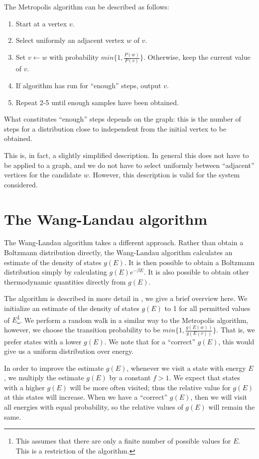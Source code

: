 \documentclass{article}
\begin{document}
The Metropolis algorithm can be described as follows:
\begin{enumerate}
    \item Start at a vertex $v$.
    \item Select uniformly an adjacent vertex $w$ of $v$.
    \item Set $v \leftarrow w$ with probability $min\{1, \frac{P(w)}{P(v)}\}$. Otherwise, keep the current value of $v$.
    \item If algorithm has run for ``enough'' steps, output $v$.
    \item Repeat 2-5 until enough samples have been obtained.
\end{enumerate}

What constitutes ``enough'' steps depends on the graph: this is the number of steps for a distribution close to independent from the initial vertex to be obtained.

This is, in fact, a slightly simplified description.
In general this does not have to be applied to a graph, and we do not have to select uniformly between ``adjacent'' vertices for the candidate $w$.
However, this description is valid for the system considered.

\section{The Wang-Landau algorithm}
The Wang-Landau algorithm takes a different approach.
Rather than obtain a Boltzmann distribution directly, the Wang-Landau algorithm calculates an estimate of the density of states $g(E)$.
It is then possible to obtain a Boltzmann distribution simply by calculating $g(E)e^{-\beta E}$.
It is also possible to obtain other thermodynamic quantities directly from $g(E)$.

The algorithm is described in more detail in \cite{WangLandau}, we give a brief overview here.
We initialize an estimate of the density of states $g(E)$ to 1 for all permitted values of $E$\footnote{This assumes that there are only a finite number of possible values for $E$. This is a restriction of the algorithm.}.
We perform a random walk in a similar way to the Metropolis algorithm, however, we choose the transition probability to be $min\{1, \frac{g(E(w))}{g(E(v))}\}$.
That is, we prefer states with a lower $g(E)$.
We note that for a ``correct'' $g(E)$, this would give us a uniform distribution over energy.

In order to improve the estimate $g(E)$, whenever we visit a state with energy $E$, we multiply the estimate $g(E)$ by a constant $f>1$.
We expect that states with a higher $g(E)$ will be more often visited; thus the relative value for $g(E)$ at this states will increase.
When we have a ``correct'' $g(E)$, then we will visit all energies with equal probability, so the relative values of $g(E)$ will remain the same.
\end{document}
